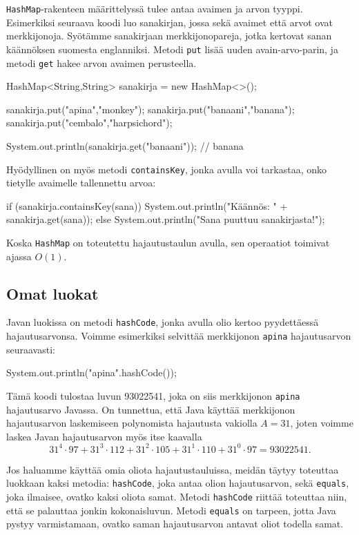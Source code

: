 \texttt{HashMap}-rakenteen määrittelyssä tulee antaa
avaimen ja arvon tyyppi.
Esimerkiksi seuraava koodi luo sanakirjan, jossa sekä
avaimet että arvot ovat merkkijonoja.
Syötämme sanakirjaan merkkijonopareja, jotka kertovat
sanan käännöksen suomesta englanniksi.
Metodi \texttt{put} lisää uuden avain-arvo-parin,
ja metodi \texttt{get} hakee arvon avaimen perusteella.

\begin{code}
HashMap<String,String> sanakirja = new HashMap<>();

sanakirja.put("apina","monkey");
sanakirja.put("banaani","banana");
sanakirja.put("cembalo","harpsichord");

System.out.println(sanakirja.get("banaani")); // banana
\end{code}

Hyödyllinen on myös metodi \texttt{containsKey},
jonka avulla voi tarkastaa, onko tietylle avaimelle
tallennettu arvoa:

\begin{code}
if (sanakirja.containsKey(sana)) {
    System.out.println("Käännös: " + sanakirja.get(sana));
} else {
    System.out.println("Sana puuttuu sanakirjasta!");
}
\end{code}

Koska \texttt{HashMap} on toteutettu hajautustaulun avulla,
sen operaatiot toimivat ajassa $O(1)$.

\subsection{Omat luokat}

Javan luokissa on metodi \texttt{hashCode},
jonka avulla olio kertoo pyydettäessä hajautusarvonsa.
Voimme esimerkiksi selvittää merkkijonon \texttt{apina}
hajautusarvon seuraavasti:

\begin{code}
System.out.println("apina".hashCode());
\end{code}

Tämä koodi tulostaa luvun 93022541,
joka on siis merkkijonon \texttt{apina} hajautusarvo Javassa.
On tunnettua, että Java käyttää merkkijonon hajautusarvon laskemiseen
polynomista hajautusta vakiolla $A=31$,
joten voimme laskea Javan hajautusarvon myös itse kaavalla
\[31^4 \cdot 97+31^3 \cdot 112+31^2 \cdot 105+31^1 \cdot 110+31^0 \cdot 97=93022541.\]

Jos haluamme käyttää omia oliota hajautustauluissa,
meidän täytyy toteuttaa luokkaan kaksi metodia:
\texttt{hashCode}, joka antaa olion hajautusarvon,
sekä \texttt{equals},
joka ilmaisee, ovatko kaksi oliota samat.
Metodi \texttt{hashCode} riittää toteuttaa niin,
että se palauttaa jonkin kokonaisluvun.
Metodi \texttt{equals} on tarpeen,
jotta Java pystyy varmistamaan, ovatko saman hajautusarvon
antavat oliot todella samat.

